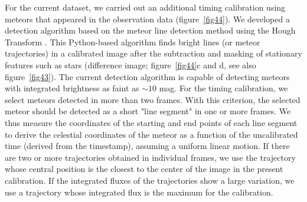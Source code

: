 \documentclass{pasj01}
\begin{document}
For the current dataset, we carried out an additional timing calibration 
using meteors 
that appeared in the observation data (figure~\ref{fig44}). 
We developed a detection algorithm based on the 
meteor line detection method using the Hough Transform \citep{gural08}.
This Python-based  algorithm finds bright lines (or meteor trajectories)
in a calibrated image after the subtraction and masking of stationary features such as stars 
(difference image; figure~\ref{fig44}c and d, see also figure~\ref{fig43}).
The current detection algorithm is capable of detecting meteors 
with integrated brightness as faint as $\sim 10$ mag.
For the timing calibration, we select meteors detected in more than two frames.
With this criterion, 
the selected meteor should be detected as a short "line segment" in one or more frames. 
We thus measure the coordinates of the starting and end points of each line segment
to derive the celestial coordinates of the meteor as a function of the uncalibrated time (derived from the timestamp), 
assuming a uniform linear motion. 
If there are two or more trajectories obtained in individual frames, 
we use the trajectory whose central position is the closest to the center of the image in the present calibration.
If the integrated fluxes of the trajectories show a large variation, 
we use a trajectory whose integrated flux is the maximum for the calibration.
\end{document}
